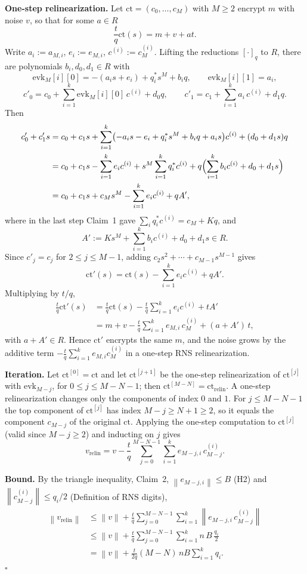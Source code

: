 \documentclass[11pt]{article}
\newcommand{\norm}[1]{\left\lVert #1\right\rVert}
\newcommand{\ct}{\mathrm{ct}}
\newcommand{\ctrelin}{\mathrm{ct}_{\mathrm{relin}}}
\newcommand{\vrelin}{v_{\mathrm{relin}}}
\newcommand{\qstar}[1]{q^{*}_{#1}}
\theoremstyle{plain}
\theoremstyle{definition}
\theoremstyle{remark}
\begin{document}
\textbf{One-step relinearization.} Let $\ct=(c_0,\dots,c_M)$ with $M\geq2$ encrypt $m$ with
noise $v$, so that for some $a\in R$
\[
 \frac{t}{q}\ct(s)=m+v+at .
\]
Write $a_i:=a_{M,i}$, $e_i:=e_{M,i}$, $c^{(i)}:=c_M^{(i)}$. Lifting the reductions $[\cdot]_q$ to $R$,
there are polynomials $b_i,d_0,d_1\in R$ with
\[
 \mathrm{evk}_M[i][0]=-(a_is+e_i)+\qstar{i}s^M+b_iq,\qquad
 \mathrm{evk}_M[i][1]=a_i,
\]
\[
 c'_0=c_0+\sum_{i=1}^{k}\mathrm{evk}_M[i][0]\,c^{(i)}+d_0q,\qquad
 c'_1=c_1+\sum_{i=1}^{k}a_i\,c^{(i)}+d_1q .
\]
Then
\begin{align*}
c'_0+c'_1s
&=c_0+c_1s+\sum_{i=1}^{k}\bigl(-a_is-e_i+\qstar{i}s^M+b_iq+a_is\bigr)c^{(i)}+(d_0+d_1s)q\\
&=c_0+c_1s-\sum_{i=1}^{k}e_ic^{(i)}+s^M\sum_{i=1}^{k}\qstar{i}c^{(i)}
   +q\Bigl(\sum_{i=1}^{k}b_ic^{(i)}+d_0+d_1s\Bigr)\\
&=c_0+c_1s+c_Ms^M-\sum_{i=1}^{k}e_ic^{(i)}+qA',
\end{align*}
where in the last step Claim~1 gave $\sum_i\qstar{i}c^{(i)}=c_M+Kq$, and
\[
 A':=Ks^M+\sum_{i=1}^{k}b_ic^{(i)}+d_0+d_1s\in R .
\]
Since $c'_j=c_j$ for $2\leq j\leq M-1$, adding $c_2s^2+\cdots+c_{M-1}s^{M-1}$ gives
\[
 \ct'(s)=\ct(s)-\sum_{i=1}^{k}e_ic^{(i)}+qA' .
\]
Multiplying by $t/q$,
\begin{align*}
\frac{t}{q}\ct'(s)
&=\frac{t}{q}\ct(s)-\frac{t}{q}\sum_{i=1}^{k}e_ic^{(i)}+tA'\\
&=m+v-\frac{t}{q}\sum_{i=1}^{k}e_{M,i}\,c_M^{(i)}+(a+A')\,t ,
\end{align*}
with $a+A'\in R$. Hence $\ct'$ encrypts the same $m$, and the noise grows by the additive term
$-\frac{t}{q}\sum_{i=1}^{k}e_{M,i}c_M^{(i)}$ in a one-step RNS relinearization.

\textbf{Iteration.} Let $\ct^{[0]}=\ct$ and let $\ct^{[j+1]}$ be the one-step relinearization of
$\ct^{[j]}$ with $\mathrm{evk}_{M-j}$, for $0\leq j\leq M-N-1$; then $\ct^{[M-N]}=\ctrelin$. A one-step
relinearization changes only the components of index $0$ and $1$. For $j\leq M-N-1$ the top component
of $\ct^{[j]}$ has index $M-j\geq N+1\geq2$, so it equals the component $c_{M-j}$ of the original $\ct$.
Applying the one-step computation to $\ct^{[j]}$ (valid since $M-j\geq2$) and inducting on $j$ gives
\[
 \vrelin=v-\frac{t}{q}\sum_{j=0}^{M-N-1}\sum_{i=1}^{k}e_{M-j,i}\,c_{M-j}^{(i)} .
\]

\textbf{Bound.} By the triangle inequality, Claim~2, $\norm{e_{M-j,i}}\leq B$ (H2) and
$\norm{c_{M-j}^{(i)}}\leq q_i/2$ (Definition of RNS digits),
\begin{align*}
\norm{\vrelin}
&\leq\norm{v}+\frac{t}{q}\sum_{j=0}^{M-N-1}\sum_{i=1}^{k}\norm{e_{M-j,i}\,c_{M-j}^{(i)}}\\
&\leq\norm{v}+\frac{t}{q}\sum_{j=0}^{M-N-1}\sum_{i=1}^{k}n\,B\,\frac{q_i}{2}\\
&=\norm{v}+\frac{t}{2q}(M-N)\,nB\sum_{i=1}^{k}q_i .
\end{align*}
\hfill$\square$
\end{document}
